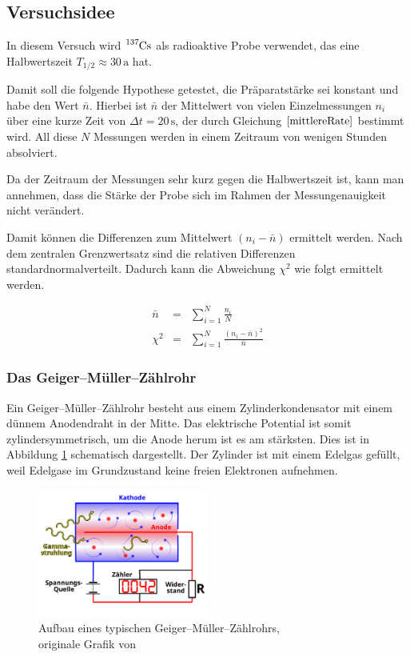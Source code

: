 \documentclass[12pt,a4paper]{scrartcl}
\numberwithin{equation}{section} %
\begin{document}
\hypertarget{versuchsidee}{%
\subsection{Versuchsidee}\label{versuchsidee}}

In diesem Versuch wird $\ce{^{137}Cs}$ als radioaktive Probe verwendet, das eine Halbwertszeit $T_{1/2}\approx 30\,\mathrm a$ hat.

Damit soll die folgende Hypothese getestet, die Präparatstärke sei konstant und habe den Wert $\bar n$. Hierbei ist $\bar n$ der Mittelwert von vielen Einzelmessungen $n_i$ über eine kurze Zeit von $\Delta t=20\,\mathrm s$, der durch Gleichung $\eqref{mittlereRate}$ bestimmt wird. All diese $N$ Messungen werden in einem Zeitraum von wenigen Stunden absolviert.

Da der Zeitraum der Messungen sehr kurz gegen die Halbwertszeit ist, kann man annehmen, dass die Stärke der Probe sich im Rahmen der Messungenauigkeit nicht verändert.

Damit können die Differenzen zum Mittelwert $(n_i-\bar n)$ ermittelt werden. Nach dem zentralen Grenzwertsatz sind die relativen Differenzen standardnormalverteilt. Dadurch kann die Abweichung $\chi^2$ wie folgt ermittelt werden.

\begin{eqnarray}
    \bar n &=& \sum_{i=1}^N \frac{n_i}{N} \label{mittlereRate} \\
    \chi^2 &=& \sum_{i=1}^N \frac{(n_i-\bar n)^2}{\bar n} \label{ChiSquared}
\end{eqnarray}

\subsubsection{Das Geiger--Müller--Zählrohr}
\label{Geiger--Müller--Zählrohr}
Ein Geiger--Müller--Zählrohr besteht aus einem Zylinderkondensator mit einem dünnem Anodendraht in der Mitte. Das elektrische Potential ist somit zylindersymmetrisch, um die Anode herum ist es am stärksten. Dies ist in Abbildung \ref{fig:Geiger--Müller--Zählrohr} schematisch dargestellt. Der Zylinder ist mit einem Edelgas gefüllt, weil Edelgase im Grundzustand keine freien Elektronen aufnehmen.

\begin{figure}[h!]
	\centering
	\includegraphics[width=0.5\textwidth]{../media/B3.1/Geiger_Mueller_Counter_with_Circuit-de.pdf}
	\caption{Aufbau eines typischen Geiger--Müller--Zählrohrs, \\
		originale Grafik von \cite{File:Geigerzählrohr}}
	\label{fig:Geiger--Müller--Zählrohr}
\end{figure}
\end{document}
